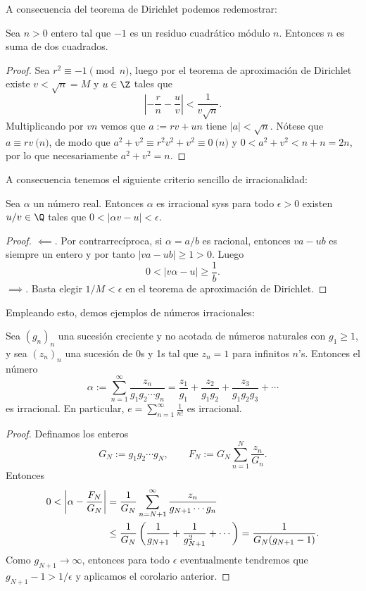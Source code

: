 \documentclass[teoria-numeros.tex]{subfiles}
\begin{document}
A consecuencia del teorema de Dirichlet podemos redemostrar:
\begin{cor}
	Sea $n > 0$ entero tal que $-1$ es un residuo cuadrático módulo $n$.
	Entonces $n$ es suma de dos cuadrados.
\end{cor}
\begin{proof}
	Sea $r^2 \equiv -1 \pmod{n}$, luego por el teorema de aproximación de Dirichlet existe $v < \sqrt{n} = M$ y $u \in \Z$ tales que
	$$ \left| -\frac{r}{n} - \frac{u}{v} \right| < \frac{1}{v\sqrt{n}}. $$
	Multiplicando por $vn$ vemos que $a := rv + un$ tiene $|a| < \sqrt{n}$.
	Nótese que $a \equiv rv \pod n$, de modo que $a^2 + v^2 \equiv r^2v^2 + v^2 \equiv 0 \pod n$
	y $0 < a^2 + v^2 < n + n = 2n$, por lo que necesariamente $a^2 + v^2 = n$.
\end{proof}

A consecuencia tenemos el siguiente criterio sencillo de irracionalidad:
\begin{cor}
	Sea $\alpha$ un número real.
	Entonces $\alpha$ es irracional syss para todo $\epsilon > 0$ existen $u/v \in \Q$ tales que $0 < |\alpha v - u| < \epsilon$.
\end{cor}
\begin{proof}
	$\impliedby$. Por contrarrecíproca, si $\alpha = a/b$ es racional, entonces $va - ub$ es siempre un entero y por tanto
	$|va - ub| \ge 1 > 0$. Luego
	$$ 0 < |v \alpha - u| \ge \frac{1}{b}. $$
	$\implies$. Basta elegir $1/M < \epsilon$ en el teorema de aproximación de Dirichlet.
\end{proof}

Empleando esto, demos ejemplos de números irracionales:
\begin{prop}\label{thm:irrational_numbers_thr_approx}
	Sea $(g_n)_n$ una sucesión creciente y no acotada de números naturales con $g_1 \ge 1$, y sea $(z_n)_n$ una sucesión de 0s y 1s
	tal que $z_n = 1$ para infinitos $n$'s.
	Entonces el número
	$$ \alpha := \sum_{n=1}^{\infty} \frac{z_n}{g_1g_2 \cdots g_n} = \frac{z_1}{g_1} + \frac{z_2}{g_1g_2} + \frac{z_3}{g_1g_2g_3} + \cdots $$
	es irracional.
	En particular, $e = \sum_{n=1}^{\infty} \frac{1}{n!}$ es irracional.
\end{prop}
\begin{proof}
	Definamos los enteros
	$$ G_N := g_1 g_2 \cdots g_N, \qquad F_N := G_N \sum_{n=1}^{N} \frac{z_n}{G_n}. $$
	Entonces
	\begin{align}
		0 < \left| \alpha - \frac{F_N}{G_N} \right| &= \frac{1}{G_N} \sum_{n = N+1}^{\infty} \frac{z_n}{g_{N+1} \cdots g_n} \notag \\
							    &\le \frac{1}{G_N}\left( \frac{1}{g_{N+1}} + \frac{1}{g_{N+1}^2}
							    + \cdots \right) = \frac{1}{G_N(g_{N+1} - 1)}. \label{eqn:eeerational}
	\end{align}
	Como $g_{N+1} \to \infty$, entonces para todo $\epsilon$ eventualmente tendremos que $g_{N+1} - 1 > 1/\epsilon$ y aplicamos el corolario anterior.
\end{proof}
\end{document}
